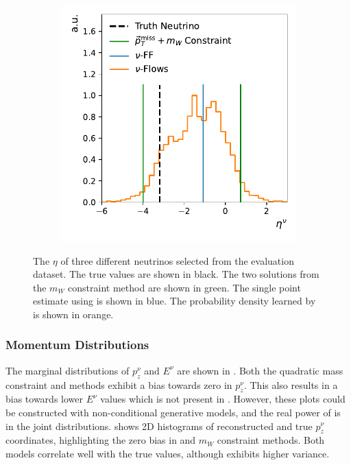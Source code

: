 \begin{figure}[ht]
\begin{subfigure}{0.32\textwidth}
    \caption{} \label{fig:inf_ambig}
    \end{subfigure}
    \begin{subfigure}{0.32\textwidth}
        \includegraphics[width=\textwidth]{Figures/neutrino_unfolding/eta_12.pdf}
        \caption{} \label{fig:inf_bad}
    \end{subfigure}
    \caption{The $\eta$ of three different neutrinos selected from the evaluation dataset. The true values are shown in black. The two solutions from the $m_W$ constraint method are shown in green. The single point estimate using \vff is shown in blue. The probability density learned by \vflows is shown in orange.}
    \label{fig:inference}
\end{figure}

\subsubsection{Momentum Distributions}

The marginal distributions of $p_z^\nu$ and $E^\nu$ are shown in .
Both the quadratic mass constraint and \vff methods exhibit a bias towards zero in $p_z^\nu$.
This also results in a bias towards lower $E^\nu$ values which is not present in \vsample.
However, these plots could be constructed with non-conditional generative models, and the real power of \vflows is in the joint distributions.
 shows 2D histograms of reconstructed and true $p_z^\nu$ coordinates, highlighting the zero bias in \vff and $m_W$ constraint methods.
Both \vflows models correlate well with the true values, although \vsample exhibits higher variance.

